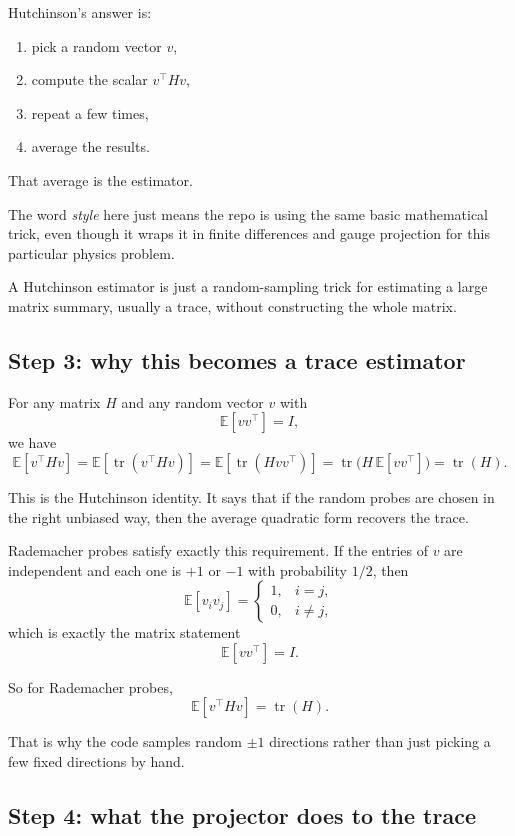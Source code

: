 \documentclass[11pt,letterpaper]{article}
\newcommand{\E}{\mathbb{E}}
\newcommand{\tr}{\operatorname{tr}}
\begin{document}
Hutchinson's answer is:
\begin{enumerate}[leftmargin=*]
  \item pick a random vector $v$,
  \item compute the scalar $v^\top H v$,
  \item repeat a few times,
  \item average the results.
\end{enumerate}

That average is the estimator.

The word \emph{style} here just means the repo is using the same basic
mathematical trick, even though it wraps it in finite differences and gauge
projection for this particular physics problem.

\begin{takeaway}
A Hutchinson estimator is just a random-sampling trick for estimating a large
matrix summary, usually a trace, without constructing the whole matrix.
\end{takeaway}

\subsection{Step 3: why this becomes a trace estimator}

For any matrix $H$ and any random vector $v$ with
\[
\E[v v^\top] = I,
\]
we have
\[
\E[v^\top H v]
=
\E[\tr(v^\top H v)]
=
\E[\tr(H v v^\top)]
=
\tr\!\bigl(H\,\E[v v^\top]\bigr)
=
\tr(H).
\]

This is the Hutchinson identity. It says that if the random probes are chosen in
the right unbiased way, then the average quadratic form recovers the trace.

Rademacher probes satisfy exactly this requirement. If the entries of $v$ are
independent and each one is $+1$ or $-1$ with probability $1/2$, then
\[
\E[v_i v_j] =
\begin{cases}
1, & i=j,\\
0, & i\neq j,
\end{cases}
\]
which is exactly the matrix statement
\[
\E[v v^\top] = I.
\]

So for Rademacher probes,
\[
\E[v^\top H v] = \tr(H).
\]

That is why the code samples random $\pm 1$ directions rather than just picking
a few fixed directions by hand.

\subsection{Step 4: what the projector does to the trace}
\end{document}
